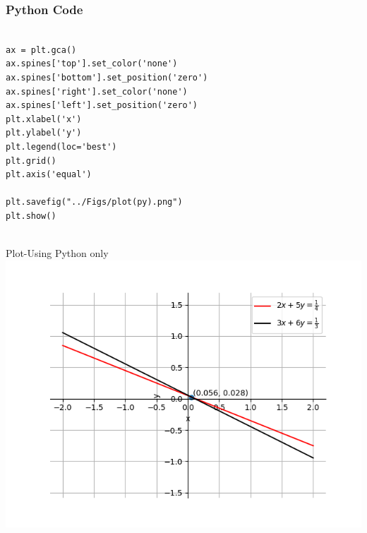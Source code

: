 \documentclass{beamer}
\begin{document}
\begin{frame}[fragile]
    \frametitle{Python Code}
    \begin{lstlisting}

ax = plt.gca()
ax.spines['top'].set_color('none')
ax.spines['bottom'].set_position('zero')
ax.spines['right'].set_color('none')
ax.spines['left'].set_position('zero')
plt.xlabel('x')
plt.ylabel('y')
plt.legend(loc='best')
plt.grid()
plt.axis('equal')

plt.savefig("../Figs/plot(py).png")
plt.show()


    \end{lstlisting}
\end{frame}


\begin{frame}{Plot-Using Python only}
    \centering
    \includegraphics[width=\columnwidth, height=0.8\textheight, keepaspectratio]{Figs/plot(py).png}     
\end{frame}
\end{document}
